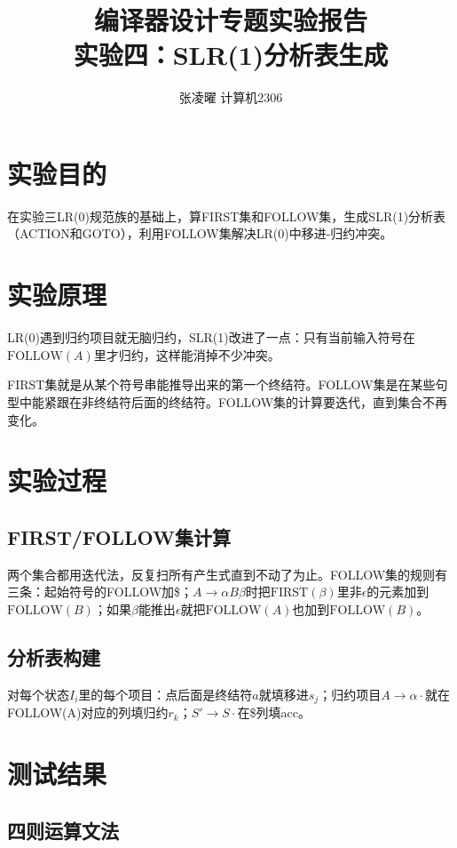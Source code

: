 \documentclass[12pt,a4paper]{ctexart}
\title{\textbf{编译器设计专题实验报告}\\[0.5em]\Large\color{themecolor}实验四：SLR(1)分析表生成}
\author{张凌曜 \quad 2234214014 \quad 计算机2306}
\date{}
\begin{document}
\maketitle

\section{实验目的}
在实验三LR(0)规范族的基础上，算FIRST集和FOLLOW集，生成SLR(1)分析表（ACTION和GOTO），利用FOLLOW集解决LR(0)中移进-归约冲突。

\section{实验原理}
LR(0)遇到归约项目就无脑归约，SLR(1)改进了一点：只有当前输入符号在$\text{FOLLOW}(A)$里才归约，这样能消掉不少冲突。

FIRST集就是从某个符号串能推导出来的第一个终结符。FOLLOW集是在某些句型中能紧跟在非终结符后面的终结符。FOLLOW集的计算要迭代，直到集合不再变化。

\section{实验过程}

\subsection{FIRST/FOLLOW集计算}
两个集合都用迭代法，反复扫所有产生式直到不动了为止。FOLLOW集的规则有三条：起始符号的FOLLOW加\$；$A \to \alpha B\beta$时把$\text{FIRST}(\beta)$里非$\epsilon$的元素加到$\text{FOLLOW}(B)$；如果$\beta$能推出$\epsilon$就把$\text{FOLLOW}(A)$也加到$\text{FOLLOW}(B)$。

\subsection{分析表构建}
对每个状态$I_i$里的每个项目：点后面是终结符$a$就填移进$s_j$；归约项目$A \to \alpha\cdot$就在FOLLOW(A)对应的列填归约$r_k$；$S' \to S\cdot$在\$列填acc。

\section{测试结果}

\subsection{四则运算文法}
\end{document}
